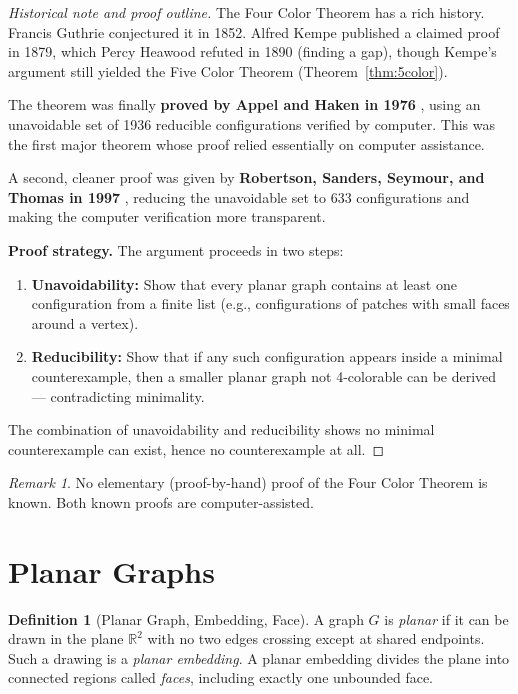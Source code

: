 \documentclass[12pt,a4paper]{amsart}
\theoremstyle{definition}
\newtheorem{definition}[theorem]{Definition}
\theoremstyle{remark}
\newtheorem{remark}[theorem]{Remark}
\newcommand{\R}{\mathbb{R}}
\begin{document}
\begin{proof}[Historical note and proof outline]
The Four Color Theorem has a rich history. Francis Guthrie conjectured it in
1852. Alfred Kempe published a claimed proof in 1879, which Percy Heawood
refuted in 1890 (finding a gap), though Kempe's argument still yielded the
Five Color Theorem (Theorem~\ref{thm:5color}).

The theorem was finally \textbf{proved by Appel and Haken in 1976}
\cite{appelhaken1977}, using an unavoidable set of 1936 reducible
configurations verified by computer. This was the first major theorem whose
proof relied essentially on computer assistance.

A second, cleaner proof was given by \textbf{Robertson, Sanders, Seymour, and
Thomas in 1997} \cite{robertson1997}, reducing the unavoidable set to 633
configurations and making the computer verification more transparent.

\textbf{Proof strategy.} The argument proceeds in two steps:
\begin{enumerate}
  \item \textbf{Unavoidability:} Show that every planar graph contains at least
        one configuration from a finite list (e.g., configurations of patches
        with small faces around a vertex).
  \item \textbf{Reducibility:} Show that if any such configuration appears
        inside a minimal counterexample, then a smaller planar graph not
        4-colorable can be derived — contradicting minimality.
\end{enumerate}
The combination of unavoidability and reducibility shows no minimal
counterexample can exist, hence no counterexample at all.
\end{proof}

\begin{remark}
No elementary (proof-by-hand) proof of the Four Color Theorem is known. Both
known proofs are computer-assisted.
\end{remark}

\section{Planar Graphs}
\label{sec:planar}

\begin{definition}[Planar Graph, Embedding, Face]
A graph $G$ is \emph{planar} if it can be drawn in the plane $\R^2$ with no
two edges crossing except at shared endpoints. Such a drawing is a \emph{planar
embedding}. A planar embedding divides the plane into connected regions called
\emph{faces}, including exactly one unbounded face.
\end{definition}
\end{document}
